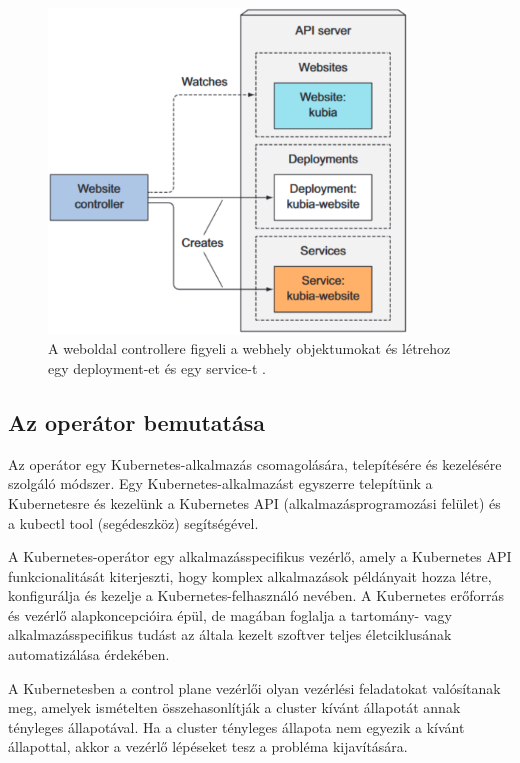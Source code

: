 \begin{figure}[ht]
    \centering
         \includegraphics[width=0.85\textwidth]{figures/kubernetes/custom-controller.png}
          \caption{A weboldal controllere figyeli a webhely objektumokat és létrehoz egy deployment-et és egy service-t \cite{Marko17}.}
           \label{custom-controller}
\end{figure}

\subsection{Az operátor bemutatása}
Az operátor egy Kubernetes-alkalmazás csomagolására, telepítésére és kezelésére szolgáló módszer. Egy Kubernetes-alkalmazást egyszerre telepítünk a Kubernetesre és kezelünk a Kubernetes API (alkalmazásprogramozási felület) és a kubectl tool (segédeszköz) segítségével.

A Kubernetes-operátor egy alkalmazásspecifikus vezérlő, amely a Kubernetes API funkcionalitását kiterjeszti, hogy komplex alkalmazások példányait hozza létre, konfigurálja és kezelje a Kubernetes-felhasználó nevében.
A Kubernetes erőforrás és vezérlő alapkoncepcióira épül, de magában foglalja a tartomány- vagy alkalmazásspecifikus tudást az általa kezelt szoftver teljes életciklusának automatizálása érdekében. 

A Kubernetesben a control plane vezérlői olyan vezérlési feladatokat valósítanak meg, amelyek ismételten összehasonlítják a cluster kívánt állapotát annak tényleges állapotával.
Ha a cluster tényleges állapota nem egyezik a kívánt állapottal, akkor a vezérlő lépéseket tesz a probléma kijavítására. 

